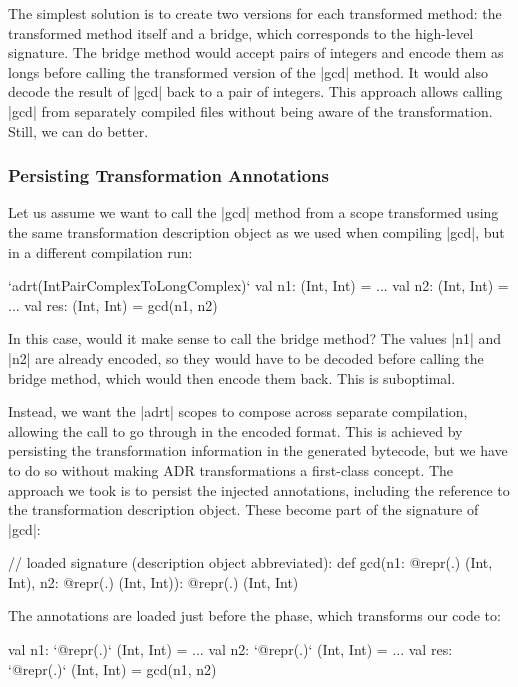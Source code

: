 The simplest solution is to create two versions for each transformed method: the transformed method itself and a bridge, which corresponds to the high-level signature. The bridge method would accept pairs of integers and encode them as longs before calling the transformed version of the |gcd| method. It would also decode the result of |gcd| back to a pair of integers. This approach allows calling |gcd| from separately compiled files without being aware of the transformation. Still, we can do better.


\subsubsection*{Persisting Transformation Annotations}

Let us assume we want to call the |gcd| method from a scope transformed using the same transformation description object as we used when compiling |gcd|, but in a different compilation run:

\begin{lstlisting-nobreak}
`adrt(IntPairComplexToLongComplex)` {
  val n1: (Int, Int) = ...
  val n2: (Int, Int) = ...
  val res: (Int, Int) = gcd(n1, n2)
}
\end{lstlisting-nobreak}

In this case, would it make sense to call the bridge method? The values |n1| and |n2| are already encoded, so they would have to be decoded before calling the bridge method, which would then encode them back. This is suboptimal.

Instead, we want the |adrt| scopes to compose across separate compilation, allowing the call to go through in the encoded format.  This is achieved by persisting the transformation information in the generated bytecode, but we have to do so without making ADR transformations a first-class concept. The approach we took is to persist the injected annotations, including the reference to the transformation description object. These become part of the signature of |gcd|:

\begin{lstlisting-nobreak}
// loaded signature (description object abbreviated):
def gcd(n1: @repr(.) (Int, Int), n2: @repr(.) (Int, Int)): @repr(.) (Int, Int)
\end{lstlisting-nobreak}

The annotations are loaded just before the \inject{} phase, which transforms our code to:

\begin{lstlisting-nobreak}
val n1: `@repr(.)` (Int, Int) = ...
val n2: `@repr(.)` (Int, Int) = ...
val res: `@repr(.)` (Int, Int) = gcd(n1, n2)
\end{lstlisting-nobreak}

